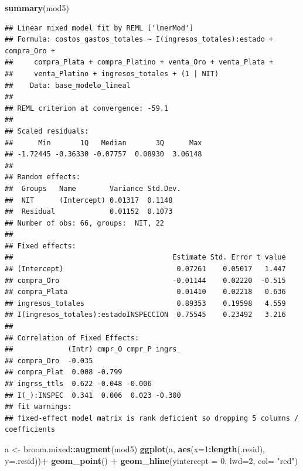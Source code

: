 \documentclass[
  11pt,
  a4paper,
]{book}
\newenvironment{Shaded}{\begin{snugshade}}{\end{snugshade}}
\newcommand{\DataTypeTok}[1]{\textcolor[rgb]{0.13,0.29,0.53}{#1}}
\newcommand{\DecValTok}[1]{\textcolor[rgb]{0.00,0.00,0.81}{#1}}
\newcommand{\KeywordTok}[1]{\textcolor[rgb]{0.13,0.29,0.53}{\textbf{#1}}}
\newcommand{\NormalTok}[1]{#1}
\newcommand{\OperatorTok}[1]{\textcolor[rgb]{0.81,0.36,0.00}{\textbf{#1}}}
\newcommand{\StringTok}[1]{\textcolor[rgb]{0.31,0.60,0.02}{#1}}
\begin{document}
\begin{Shaded}
\begin{Highlighting}[]
\KeywordTok{summary}\NormalTok{(mod5)}
\end{Highlighting}
\end{Shaded}

\begin{verbatim}
## Linear mixed model fit by REML ['lmerMod']
## Formula: costos_gastos_totales ~ I(ingresos_totales):estado + compra_Oro +  
##     compra_Plata + compra_Platino + venta_Oro + venta_Plata +  
##     venta_Platino + ingresos_totales + (1 | NIT)
##    Data: base_modelo_lineal
## 
## REML criterion at convergence: -59.1
## 
## Scaled residuals: 
##      Min       1Q   Median       3Q      Max 
## -1.72445 -0.36330 -0.07757  0.08930  3.06148 
## 
## Random effects:
##  Groups   Name        Variance Std.Dev.
##  NIT      (Intercept) 0.01317  0.1148  
##  Residual             0.01152  0.1073  
## Number of obs: 66, groups:  NIT, 22
## 
## Fixed effects:
##                                      Estimate Std. Error t value
## (Intercept)                           0.07261    0.05017   1.447
## compra_Oro                           -0.01144    0.02220  -0.515
## compra_Plata                          0.01410    0.02218   0.636
## ingresos_totales                      0.89353    0.19598   4.559
## I(ingresos_totales):estadoINSPECCION  0.75545    0.23492   3.216
## 
## Correlation of Fixed Effects:
##             (Intr) cmpr_O cmpr_P ingrs_
## compra_Oro  -0.035                     
## compra_Plat  0.008 -0.799              
## ingrss_ttls  0.622 -0.048 -0.006       
## I(_):INSPEC  0.341  0.006  0.023 -0.300
## fit warnings:
## fixed-effect model matrix is rank deficient so dropping 5 columns / coefficients
\end{verbatim}

\begin{Shaded}
\begin{Highlighting}[]
\NormalTok{a <-}\StringTok{ }\NormalTok{broom.mixed}\OperatorTok{::}\KeywordTok{augment}\NormalTok{(mod5)}
\KeywordTok{ggplot}\NormalTok{(a, }\KeywordTok{aes}\NormalTok{(}\DataTypeTok{x=}\DecValTok{1}\OperatorTok{:}\KeywordTok{length}\NormalTok{(.resid), }\DataTypeTok{y=}\NormalTok{.resid))}\OperatorTok{+}
\StringTok{  }\KeywordTok{geom_point}\NormalTok{() }\OperatorTok{+}\StringTok{ }
\StringTok{  }\KeywordTok{geom_hline}\NormalTok{(}\DataTypeTok{yintercept =} \DecValTok{0}\NormalTok{, }\DataTypeTok{lwd=}\DecValTok{2}\NormalTok{, }\DataTypeTok{col=} \StringTok{"red"}\NormalTok{)}
\end{Highlighting}
\end{Shaded}
\end{document}
